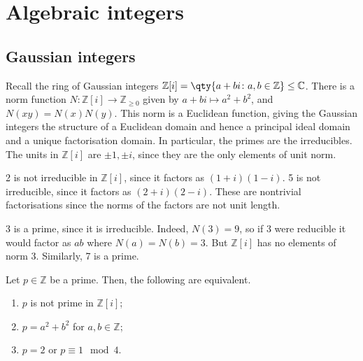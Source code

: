 \section{Algebraic integers}

\subsection{Gaussian integers}
Recall the ring of Gaussian integers $\mathbb Z[i] = \qty{a+bi \colon a, b \in \mathbb Z} \leq \mathbb C$.
There is a norm function $N \colon \mathbb Z[i] \to \mathbb Z_{\geq 0}$ given by $a + bi \mapsto a^2 + b^2$, and $N(xy) = N(x) N(y)$.
This norm is a Euclidean function, giving the Gaussian integers the structure of a Euclidean domain and hence a principal ideal domain and a unique factorisation domain.
In particular, the primes are the irreducibles.
The units in $\mathbb Z[i]$ are $\pm 1, \pm i$, since they are the only elements of unit norm.
\begin{example}
	2 is not irreducible in $\mathbb Z[i]$, since it factors as $(1+i)(1-i)$.
	5 is not irreducible, since it factors as $(2+i)(2-i)$.
	These are nontrivial factorisations since the norms of the factors are not unit length.

	3 is a prime, since it is irreducible.
	Indeed, $N(3) = 9$, so if 3 were reducible it would factor as $ab$ where $N(a) = N(b) = 3$.
	But $\mathbb Z[i]$ has no elements of norm 3.
	Similarly, 7 is a prime.
\end{example}
\begin{proposition}
	Let $p \in \mathbb Z$ be a prime.
	Then, the following are equivalent.
	\begin{enumerate}
		\item $p$ is not prime in $\mathbb Z[i]$;
		\item $p = a^2 + b^2$ for $a, b \in \mathbb Z$;
		\item $p = 2$ or $p \equiv 1 \mod 4$.
	\end{enumerate}
\end{proposition}
